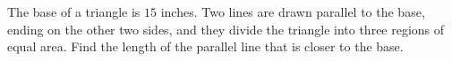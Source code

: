 The base of a triangle is $15$ inches. Two lines are drawn parallel to the base, ending on the other two sides, and they divide the triangle into three regions of equal area. Find the length of the parallel line that is closer to the base.
